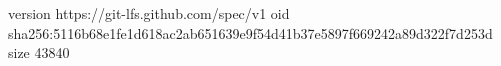 version https://git-lfs.github.com/spec/v1
oid sha256:5116b68e1fe1d618ac2ab651639e9f54d41b37e5897f669242a89d322f7d253d
size 43840
